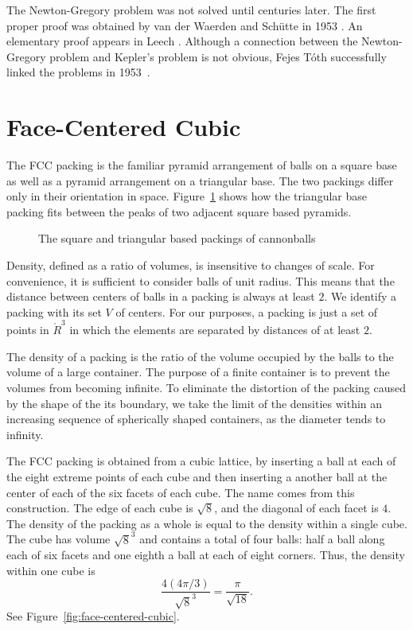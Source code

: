 The Newton-Gregory problem was not solved until centuries later.
The first proper proof was obtained by van der Waerden and
Sch\"utte in 1953 \cite{Sch53}.  An elementary proof appears in Leech
\cite{Leech:1956:MG}.  Although a connection between the Newton-Gregory
problem and Kepler's problem is not obvious, Fejes T\'oth successfully linked the
problems in 1953~\cite{Fej53}.


\section{Face-Centered Cubic}



The FCC packing is the familiar pyramid arrangement of
balls on a square base as well as a pyramid arrangement on a
triangular base.  The two packings
differ only in their orientation in space.
Figure~\ref{fig:tri-square-cannonballs} shows how the triangular base
packing fits between the peaks of two adjacent square based pyramids.

\begin{figure}[htb]
  \centering
  \caption{The square and triangular based packings of cannonballs}
  \label{fig:tri-square-cannonballs}
\end{figure}

Density, defined as a ratio of volumes, is insensitive to changes of
scale.  For convenience, it is sufficient to consider balls of unit
radius. This means that the distance between centers of balls in a
packing is always  at least $2$.  We identify a packing with its set $V$
of centers.   For our purposes, a packing is just a set of points
in $\ring{R}^3$ in which the elements are separated by distances of at least
$2$.



The density of a packing is the ratio of the volume occupied by the
balls to the volume of a large container.  The
purpose of a finite container is to prevent the volumes from becoming
infinite.  To eliminate the distortion of the packing caused by the
shape of the its boundary, we take the limit of the densities within an increasing
sequence of spherically shaped containers, as the diameter tends to infinity.

The FCC packing is  obtained from a cubic
lattice, by inserting a ball at each of the eight extreme points of
each cube and then inserting a another ball at the center of each
of the six facets of each cube.  The name  comes from this
construction.  The edge of each cube is $\sqrt8$, and the diagonal of
each facet is $4$.  
  The density of the packing as a whole 
is equal to the density within a single cube.  The cube has volume
$\sqrt8^3$  and contains a total of four balls: half a
ball along each of six facets and one eighth a ball at each of eight
corners.  Thus, the density within one cube is
   \[ 
   \frac{   4 (4\pi/3)}{\sqrt8^3} = \frac{\pi}{\sqrt{18}}.
   \] 
See Figure~\ref{fig:face-centered-cubic}.


